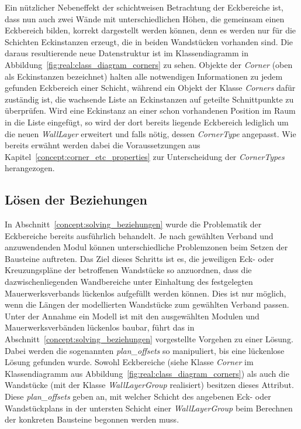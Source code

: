 Ein nützlicher Nebeneffekt der schichtweisen Betrachtung der Eckbereiche ist, dass nun auch zwei Wände mit unterschiedlichen Höhen, die gemeinsam einen Eckbereich bilden, korrekt dargestellt werden können, denn es werden nur für die Schichten Eckinstanzen erzeugt, die in beiden Wandstücken vorhanden sind.
Die daraus resultierende neue Datenstruktur ist im Klassendiagramm in Abbildung~\ref{fig:real:class_diagram_corners} zu sehen.
Objekte der \textit{Corner} (oben als Eckinstanzen bezeichnet) halten alle notwendigen Informationen zu jedem gefunden Eckbereich einer Schicht, während ein Objekt der Klasse \textit{Corners} dafür zuständig ist, die wachsende Liste an Eckinstanzen auf geteilte Schnittpunkte zu überprüfen.
Wird eine Eckinstanz an einer schon vorhandenen Position im Raum in die Liste eingefügt, so wird der dort bereits liegende Eckbereich lediglich um die neuen \textit{WallLayer} erweitert und falls nötig, dessen \textit{CornerType} angepasst.
Wie bereits erwähnt werden dabei die Voraussetzungen aus Kapitel~\ref{concept:corner_etc_properties} zur Unterscheidung der \textit{CornerTypes} herangezogen.

\subsection*{Lösen der Beziehungen}
In Abschnitt~\ref{concept:solving_beziehungen} wurde die Problematik der Eckbereiche bereits ausführlich behandelt.
Je nach gewählten Verband und anzuwendenden Modul können unterschiedliche Problemzonen beim Setzen der Bausteine auftreten.
Das Ziel dieses Schritts ist es, die jeweiligen Eck- oder Kreuzungspläne der betroffenen Wandstücke so anzuordnen, dass die dazwischenliegenden Wandbereiche unter Einhaltung des festgelegten Mauerwerksverbands lückenlos aufgefüllt werden können.
Dies ist nur möglich, wenn die Längen der modellierten Wandstücke zum gewählten Verband passen.
Unter der Annahme ein Modell ist mit den ausgewählten Modulen und Mauerwerksverbänden lückenlos baubar, führt das in Abschnitt~\ref{concept:solving_beziehungen} vorgestellte Vorgehen zu einer Lösung. 
Dabei werden die sogenannten \textit{plan\_offsets} so manipuliert, bis eine lückenlose Lösung gefunden wurde.
Sowohl Eckbereiche (siehe Klasse \textit{Corner} im Klassendiagramm aus Abbildung~\ref{fig:real:class_diagram_corners}) als auch die Wandstücke (mit der Klasse \textit{WallLayerGroup} realisiert) besitzen dieses Attribut.
Diese \textit{plan\_offsets} geben an, mit welcher Schicht des angebenen Eck- oder Wandstückplans in der untersten Schicht einer \textit{WallLayerGroup} beim Berechnen der konkreten Bausteine begonnen werden muss.


